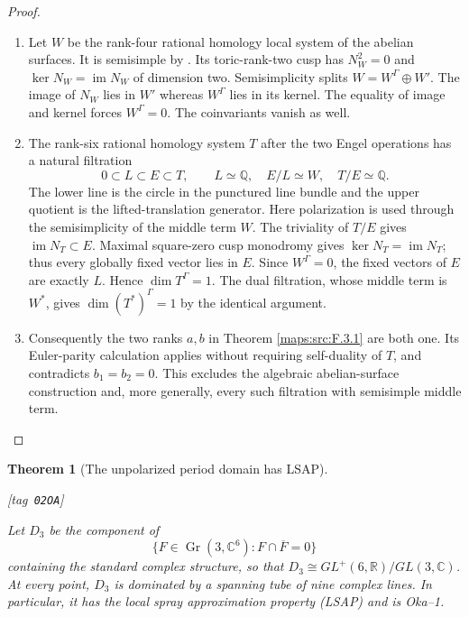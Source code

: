 \documentclass[11pt,a4paper]{article}
\numberwithin{equation}{section}
\newtheorem{theorem}{Theorem}[section]
\theoremstyle{definition}
\newcommand{\StatementRecord}[4]{{\upshape\footnotesize[tag~\texttt{#3}]}\enspace\ignorespaces}
\begin{document}
\begin{proof}
\begin{enumerate}[label=\arabic*.]
\item Let $W$ be the rank-four rational homology local system of the
abelian surfaces.  It is semisimple by
\cite[Definition 4.2.4 and Proposition 4.2.5, p.~44; Theorem 4.2.6, p.~45]{ffDeligne}.
Its toric-rank-two cusp has
$N_W^2=0$ and $\ker N_W=\operatorname{im}N_W$ of dimension two.
Semisimplicity splits $W=W^\Gamma\oplus W'$.
The image of $N_W$ lies in $W'$ whereas $W^\Gamma$ lies in its
kernel.  The equality of image and kernel forces $W^\Gamma=0$.
The coinvariants vanish as well.

\item The rank-six rational homology system $T$ after the two Engel
operations has a natural filtration
\[
 0\subset L\subset E\subset T,\qquad
 L\simeq\mathbb Q,\quad E/L\simeq W,\quad T/E\simeq\mathbb Q.
\]
The lower line is the circle in the punctured line bundle and
the upper quotient is the lifted-translation generator.
Here polarization is used through the semisimplicity of the middle term $W$.
The triviality of $T/E$ gives $\operatorname{im}N_T\subset E$.
Maximal square-zero cusp monodromy gives
$\ker N_T=\operatorname{im}N_T$; thus every globally fixed vector
lies in $E$.  Since $W^\Gamma=0$, the fixed vectors of $E$ are
exactly $L$.  Hence $\dim T^\Gamma=1$.
The dual filtration, whose middle term is $W^*$, gives
$\dim(T^*)^\Gamma=1$ by the identical argument.

\item Consequently the two ranks $a,b$ in Theorem \ref{maps:src:F.3.1} are both one.
Its Euler-parity calculation applies without requiring self-duality
of $T$, and contradicts $b_1=b_2=0$.
This excludes the algebraic abelian-surface construction and,
more generally, every such filtration with semisimple middle term.

\end{enumerate}
\end{proof}




\begin{theorem}[The unpolarized period domain has LSAP]\hypertarget{tag-02OA}{}\label{maps:src:F.3.8}
\StatementRecord{maps:src:F.3.8}{proved}{02OA}{\eqref{maps:eq:F.O3}, \eqref{maps:eq:F.O4}; \cite[Definition 2.1, p.~4]{IVVOkaOneV5}; \cite[Proposition 7.13 and preceding paragraph, pp.~23--24]{IVVOkaOneV5}}


Let $D_3$ be the component of
\[
 \{F\in\operatorname{Gr}(3,\mathbb C^6):F\cap\overline F=0\}
\]
containing the standard complex structure, so that
$D_3\cong GL^+(6,\mathbb R)/GL(3,\mathbb C)$.
At every point, $D_3$
is dominated by a spanning tube of nine complex lines.  In particular,
it has the local spray approximation property (LSAP) and is Oka--1.

\end{theorem}
\end{document}
